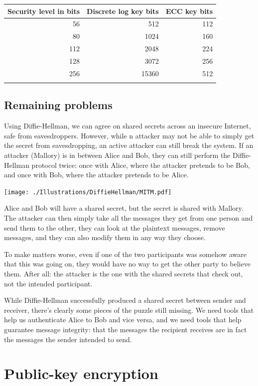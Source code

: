 \documentclass[11pt,ebook,table,dvipsnames]{memoir}
\begin{document}
\begin{center}
\begin{tabular}{rrr}
Security level in bits & Discrete log key bits & ECC key bits\\
\hline
56 & 512 & 112\\
80 & 1024 & 160\\
112 & 2048 & 224\\
128 & 3072 & 256\\
256 & 15360 & 512\\
 &  & \\
\end{tabular}
\end{center}
\section{Remaining problems}
\label{sec-2-4-5}

Using Diffie-Hellman, we can agree on shared secrets across an
insecure Internet, safe from eavesdroppers. However, while n attacker
may not be able to simply get the secret from eavesdropping, an active
attacker can still break the system. If an attacker (Mallory) is in
between Alice and Bob, they can still perform the Diffie-Hellman
protocol twice: once with Alice, where the attacker pretends to be
Bob, and once with Bob, where the attacker pretends to be Alice.

\texttt{[image: ./Illustrations/DiffieHellman/MITM.pdf]}

Alice and Bob will have a shared secret, but the secret is shared with
Mallory. The attacker can then simply take all the messages they get
from one person and send them to the other, they can look at the
plaintext messages, remove messages, and they can also modify them in
any way they choose.

To make matters worse, even if one of the two participants was somehow
aware that this was going on, they would have no way to get the other
party to believe them. After all: the attacker is the one with the
shared secrets that check out, not the intended participant.

While Diffie-Hellman successfully produced a shared secret between
sender and receiver, there's clearly some pieces of the puzzle still
missing. We need tools that help us authenticate Alice to Bob and vice
versa, and we need tools that help guarantee message integrity: that
the messages the recipient receives are in fact the messages the
sender intended to send.
\chapter{Public-key encryption}
\label{sec-2-5}
\end{document}
